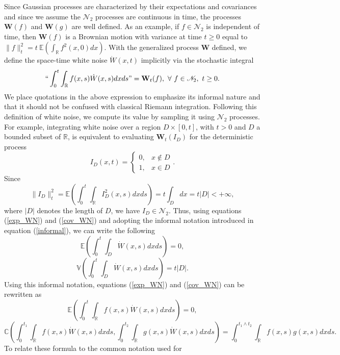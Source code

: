 \documentclass[]{article}
\begin{document}
Since Gaussian processes are characterized by their expectations and
covariances and since we assume the \(\mathscr{N}_2\) processes are
continuous in time, the processes \(\mathbf W(f)\) and \(\mathbf W(g)\)
are well defined. As an example, if \(f\in\mathscr{N}_2\) is independent
of time, then \(\mathbf W(f)\) is a Brownian motion with variance at
time \(t\geq0\) equal to
\(\|f\|_t^2=t \ \mathbb{E}(\int_\mathbb{R}f^2(x,0)dx)\). With the
generalized process \(\mathbf W\) defined, we define the space-time
white noise \(\dot W(x,t)\) implicitly via the stochastic integral
\begin{equation}\label{informal}
``\int_0^t\int_\mathbb{R}f(x,s)\dot W(x,s)dxds"=\mathbf W_t(f), \ \forall \ f\in\mathscr{N}_2, \ t\geq0.
\end{equation} We place quotations in the above expression to emphasize
its informal nature and that it should not be confused with classical
Riemann integration. Following this definition of white noise, we
compute its value by sampling it using \(\mathscr{N}_2\) processes. For
example, integrating white noise over a region \(D\times[0,t]\), with
\(t>0\) and \(D\) a bounded subset of \(\mathbb{R}\), is equivalent to
evaluating \(\mathbf W_t(I_D)\) for the deterministic process
\begin{equation}
I_D(x,t)=\left\{\begin{matrix}
0, & x\notin D \\
1, & x\in D
\end{matrix}\right..
\end{equation} Since \begin{equation}
\|I_D\|_t^2=\mathbb{E}\left(\int_0^t\int_\mathbb{R}I_D^2(x,s)dxds\right)=t\int_Ddx=t|D|<+\infty, 
\end{equation} where \(|D|\) denotes the length of \(D\), we have
\(I_D\in\mathscr{N}_2\). Thus, using equations (\ref{exp_WN}) and
(\ref{cov_WN}) and adopting the informal notation introduced in equation
(\ref{informal}), we can write the following \begin{equation}
\mathbb{E}\left(\int_0^t\int_D\dot W(x,s)dxds\right)=0,
\end{equation} \begin{equation}
\mathbb{V}\left(\int_0^t\int_D\dot W(x,s)dxds\right)=t|D|.
\end{equation} Using this informal notation, equations (\ref{exp_WN})
and (\ref{cov_WN}) can be rewritten as \begin{equation}\label{exp_WN_xi}
\mathbb{E}\left(\int_0^t\int_\mathbb{R}f(x,s)\dot W(x,s)dxds\right)=0,
\end{equation} \begin{equation}\label{cov_WN_xi}
\mathbb{C}\left(\int_0^{t_1}\int_\mathbb{R}f(x,s)\dot W(x,s)dxds,\int_0^{t_2}\int_\mathbb{R}g(x,s)\dot W(x,s)dxds\right)
=\int_0^{t_1\wedge t_2}\int_\mathbb{R}f(x,s)g(x,s)dxds.
\end{equation} To relate these formula to the common notation used for
\end{document}
